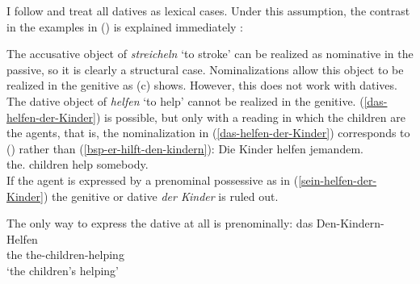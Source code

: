 I follow \citet[9]{Haider86} and treat all datives as lexical cases. Under this assumption, the
contrast in the examples in () is explained immediately \citep[]{Haider86}:
\eal
{}

\label{das-helfen-der-Kinder}
\label{sein-helfen-der-Kinder}
\zl
The accusative object of \emph{streicheln} `to stroke' can be realized as nominative in the passive,
so it is clearly a structural case. Nominalizations allow this object to be realized in the genitive
as (c) shows. However, this does not work with datives. The dative object of \emph{helfen}
`to help' cannot be realized in the genitive. (\ref{das-helfen-der-Kinder}) is possible, but only
with a reading in which the children are the agents, that is, the nominalization in
(\ref{das-helfen-der-Kinder}) corresponds to () rather than (\ref{bsp-er-hilft-den-kindern}):
\ea
\gll Die Kinder helfen jemandem.\\
     the.\NOM{} children help somebody.\DAT{}\\
\z
If the agent is expressed by a prenominal possessive as in (\ref{sein-helfen-der-Kinder}) the
genitive or dative \emph{der Kinder} is ruled out.

The only way to express the dative at all is prenominally:
\ea
\gll das Den-Kindern-Helfen\\
     the the-children-helping\\
\glt `the children's helping'
\z

